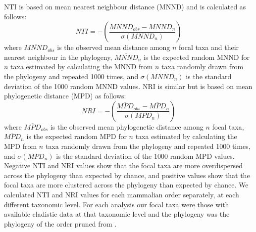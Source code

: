 \documentclass[12pt,letterpaper]{article}
\begin{document}
NTI \citep{webb2002phylogenies} is based on mean nearest neighbour distance (MNND) and is calculated as follows:
  \begin{equation}
    NTI=-\left(\frac{\overline{MNND}_{obs}-\overline{MNND}_{n}}{\sigma(MNND_{n})}\right)
  \end{equation}
where $\overline{MNND}_{obs}$ is the observed mean distance among $n$ focal taxa and their nearest neighbour in the phylogeny,
$\overline{MNND}_{n}$ is the expected random MNND for $n$ taxa estimated by calculating the MNND from $n$ taxa randomly drawn from the phylogeny and repeated 1000 times, and $\sigma(MNND_{n})$ is the standard deviation of the 1000 random MNND values. 
NRI is similar but is based on mean phylogenetic distance (MPD) as follows:
  \begin{equation}
    NRI=-\left(\frac{\overline{MPD}_{obs}-\overline{MPD}_{n}}{\sigma(MPD_{n})}\right)
  \end{equation}
where $\overline{MPD}_{obs}$ is the observed mean phylogenetic distance among $n$ focal taxa, $\overline{MPD}_{n}$ is the expected random MPD for $n$ taxa estimated by calculating the MPD from $n$ taxa randomly drawn from the phylogeny and repeated 1000 times, and $\sigma(MPD_{n})$ is the standard deviation of the 1000 random MPD values.
Negative NTI and NRI values show that the focal taxa are more overdispersed across the phylogeny than expected by chance, and positive values show that the focal taxa are more clustered across the phylogeny than expected by chance. %
We calculated NTI and NRI values for each mammalian order separately, at each different taxonomic level. 
For each analysis our focal taxa were those with available cladistic data at that taxonomic level and the phylogeny was the phylogeny of the order pruned from \citep{}. %

\end{document}
